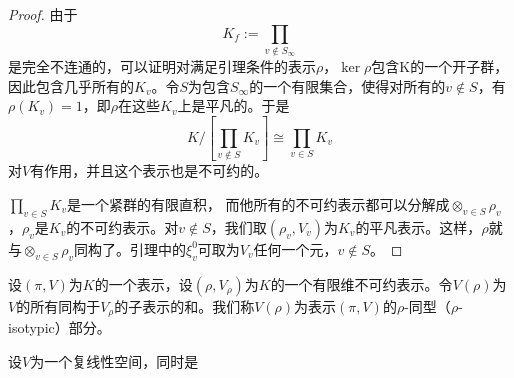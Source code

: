\begin{proof}
由于
$$K_f := \prod\limits_{v \not \in S_\infty}$$
是完全不连通的，可以证明对满足引理条件的表示$\rho$，$\ker \rho$包含K的一个开子群，因此包含几乎所有的$K_v$。令$S$为包含$S_\infty$的一个有限集合，使得对所有的$v \not \in S$，有$\rho(K_v)=1$，即$\rho$在这些$K_v$上是平凡的。于是
$$K / [ \prod\limits_{v \not\in S} K_v ] \cong \prod\limits_{v \in S} K_v $$
对$V$有作用，并且这个表示也是不可约的。

$\prod\limits_{v \in S} K_v$是一个紧群的有限直积， 而他所有的不可约表示都可以分解成$\otimes_{v\in S}\rho_v$，$\rho_v$是$K_v$的不可约表示。对$v\not\in S$，我们取$(\rho_v, V_v)$为$K_v$的平凡表示。这样，$\rho$就与$\otimes_{v\in S}\rho_v$同构了。引理中的$\xi_v^0$可取为$V_v$任何一个元，$v \not\in S$。
\end{proof}

\begin{definition}
设$(\pi, V)$为$K$的一个表示，设$(\rho, V_\rho)$为$K$的一个有限维不可约表示。令$V(\rho)$为$V$的所有同构于$V_\rho$的子表示的和。我们称$V(\rho)$为表示$(\pi, V)$的$\rho$-同型（$\rho$-
isotypic）部分。
\end{definition}

设$V$为一个复线性空间，同时是
